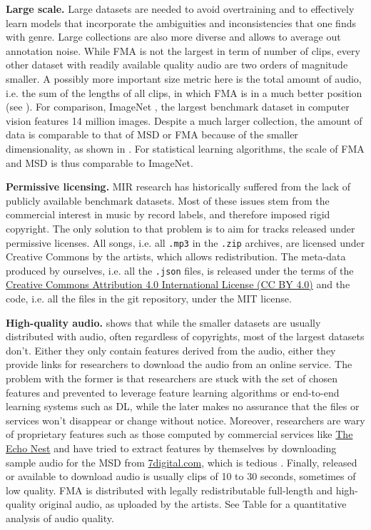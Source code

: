 \documentclass{article}
\newcommand{\todo}[1]{{\color{red} #1 }}
\begin{document}
\textbf{Large scale.} Large datasets are needed to avoid overtraining and to effectively learn models that incorporate the ambiguities and inconsistencies that one finds with genre. Large collections are also more diverse and allows to average out annotation noise. While FMA is not the largest in term of number of clips, every other dataset with readily available quality audio are two orders of magnitude smaller. A possibly more important size metric here is the total amount of audio, i.e. the sum of the lengths of all clips, in which FMA is in a much better position (see ). For comparison, ImageNet \cite{imagenet}, the largest benchmark dataset in computer vision features 14 million images. Despite a much larger collection, the amount of data is comparable to that of MSD or FMA because of the smaller dimensionality, as shown in . For statistical learning algorithms, the scale of FMA and MSD is thus comparable to ImageNet.

\textbf{Permissive licensing.} MIR research has historically suffered from the lack of publicly available benchmark datasets. Most of these issues stem from the commercial interest in music by record labels, and therefore imposed rigid copyright. The only solution to that problem is to aim for tracks released under permissive licenses. All songs, i.e. all \texttt{.mp3} in the \texttt{.zip} archives, are licensed under Creative Commons by the artists, which allows redistribution. The meta-data produced by ourselves, i.e. all the \texttt{.json} files, is released under the terms of the \href{https://creativecommons.org/licenses/by/4.0)}{Creative Commons Attribution 4.0 International License (CC BY 4.0)} and the code, i.e. all the files in the git repository, under the MIT license.

\textbf{High-quality audio.}
 shows that while the smaller datasets are usually distributed with audio, often regardless of copyrights, most of the largest datasets don't.
Either they only contain features derived from the audio, either they provide links for researchers to download the audio from an online service. The problem with the former is that researchers are stuck with the set of chosen features and prevented to leverage feature learning algorithms or end-to-end learning systems such as DL, while the later makes no assurance that the files or services won't disappear or change without notice.
Moreover, researchers are wary of proprietary features such as those computed by commercial services like \href{http://the.echonest.com/}{The Echo Nest} and have tried to extract features by themselves by downloading sample audio for the MSD from \href{https://www.7digital.com}{7digital.com}, which is tedious \cite{msd_features}.
Finally, released or available to download audio is usually clips of 10 to 30 seconds, sometimes of low quality.
FMA is distributed with legally redistributable full-length and high-quality original audio, as uploaded by the artists. \todo{See Table for a quantitative analysis of audio quality.}
\end{document}
